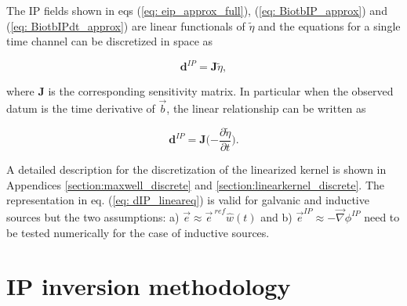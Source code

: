 \documentclass[extra,mreferee]{gji}
\newcommand{\grad}{\vec \nabla}
\renewcommand {\b}  { {\vec b} }
\newcommand {\e}  { {\vec e} }
\newcommand{\peta}{\tilde{\eta}}
\newcommand{\eref}{\e^{\ ref}}
\begin{document}
The IP fields shown in eqs (\ref{eq: eip_approx_full}), (\ref{eq: BiotbIP_approx}) and (\ref{eq: BiotbIPdt_approx}) are linear functionals of $\peta$ and the equations for a single time channel can be discretized in space as
\begin{linenomath*}
\begin{equation}
  \mathbf{d}^{IP} = \mathbf{J}\peta,
  \label{eq: dIP_lineareq}
\end{equation}
\end{linenomath*}
where $\mathbf{J}$ is the corresponding sensitivity matrix.
In particular when the observed datum is the time derivative of $\b$, the linear relationship can be written as
\begin{linenomath*}
\begin{equation}
  \mathbf{d}^{IP} = \mathbf{J}(-\frac{\partial \peta}{\partial t}\Big).
  \label{eq: dIP_lineareq_dbdt}
\end{equation}
\end{linenomath*}
A detailed description for the discretization of the linearized kernel is shown in Appendices \ref{section:maxwell_discrete} and \ref{section:linearkernel_discrete}.
The representation in eq. (\ref{eq: dIP_lineareq}) is valid for galvanic and inductive sources but the two assumptions: a) $\e \approx \eref \hat{w}(t)$ and b) $\e^{IP} \approx -\grad\phi^{IP}$ need to be tested numerically for the case of inductive sources.


\section{IP inversion methodology}
\end{document}
